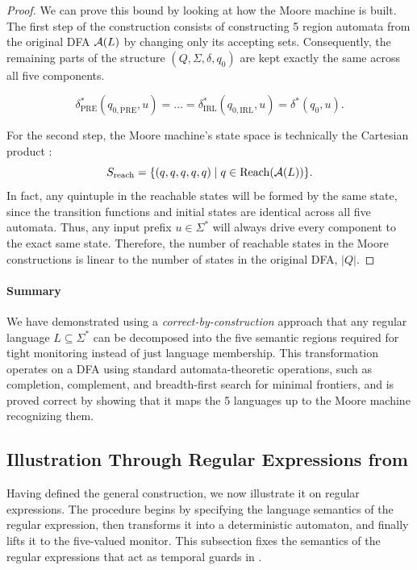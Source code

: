 \begin{proof}

  We can prove this bound by looking at how the Moore machine is built. The first step of the construction consists of constructing 5 region automata from the original DFA $\mathcal{A}(L)$ by changing only its accepting sets. Consequently, the remaining parts of the structure $(Q, \Sigma, \delta, q_0)$ are kept exactly the same across all five components.

  \[
    \delta_{\mathrm{PRE}}^*(q_{0,\mathrm{PRE}}, u) = \dots = \delta_{\mathrm{IRL}}^*(q_{0,\mathrm{IRL}}, u) = \delta^*(q_0, u).
  \]

For the second step, the Moore machine's state space is technically the Cartesian product :
 \[
    S_{\mathrm{reach}} = \{ (q, q, q, q, q) \mid q \in \mathrm{Reach}(\mathcal{A}(L)) \}.
  \]
 In fact, any quintuple in the reachable states will be formed by the same state, since the transition functions and initial states are identical across all five automata. Thus,  any input prefix $u \in \Sigma^*$ will always drive every component to the exact same state. Therefore, the number of reachable states in the Moore constructions is linear to the number of states in the original DFA, $|Q|$.

\end{proof}
\paragraph*{Summary}
We have demonstrated using a \emph{correct-by-construction} approach that any regular language $L\subseteq\Sigma^*$ can be decomposed into the five semantic regions required for tight monitoring instead of just language membership.
This transformation operates on a DFA using standard automata-theoretic operations, such as completion, complement, and breadth-first search for minimal frontiers, and is proved correct by showing that it maps the 5 languages up to the Moore machine recognizing them.

\subsection{Illustration Through Regular Expressions from \cDL}
\label{subsec:re-tight}
Having defined the general construction, we now illustrate it on \cDL regular expressions. The procedure begins by specifying the language semantics of the regular expression, then transforms it into a deterministic automaton, and finally lifts it to the five-valued monitor.
This subsection fixes the semantics of the regular expressions that act as temporal guards in \cDL.
